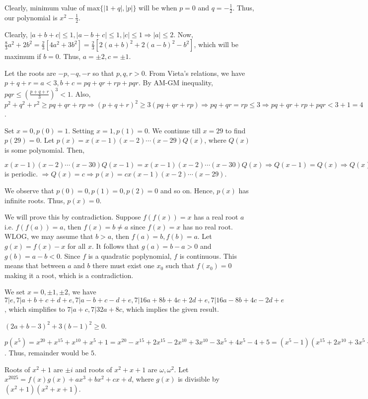   Clearly, minimum value of $\mathrm{max}\{|1 + q|, |p|\}$ will be when $p = 0$ and $q = -\frac{1}{2}$. Thus, our
  polynomial is $x^2 - \frac{1}{2}$.
\item Clearly, $|a + b + c|\leq 1, |a - b + c|\leq 1, |c|\leq 1 \Rightarrow |a|\leq 2$. Now, $\frac{8}{3}a^2
  + 2b^2 = \frac{2}{3}[4a^2 + 3b^2] = \frac{2}{3}[2(a + b)^2 + 2(a - b)^2 - b^2]$, which will be maximum if
  $b = 0$. Thus, $a = \pm 2, c = \pm 1$.
\item Let the roots are $-p, -q, -r$ so that $p, q, r > 0$. From Vieta's relations, we have $p + q + r = a <
  3, b + c = pq + qr + rp + pqr$. By AM-GM inequality, $pqr\leq\left(\frac{p + q + r}{3}\right)^3 <
  1$. Also, $p^2 + q^2 + r^2\geq pq + qr + rp \Rightarrow (p + q + r)^2\geq 3(pq + qr + rp)\Rightarrow pq +
  qr = rp \leq 3 \Rightarrow pq + qr + rp + pqr < 3 + 1 = 4$.
\item Set $x = 0, p(0) = 1$. Setting $x = 1, p(1) = 0$. We continue till $x = 29$ to find $p(29) = 0$. Let
  $p(x) = x(x - 1)(x - 2)\cdots(x - 29)Q(x)$, where $Q(x)$ is some polynomial. Then,

  $x(x - 1)(x - 2)\cdots(x- 30)Q(x - 1) = x(x - 1)(x - 2)\cdots(x - 30)Q(x)\Rightarrow Q(x - 1) = Q(x)
  \Rightarrow Q(x)$ is periodic. $\Rightarrow Q(x) = c\Rightarrow p(x) = cx(x - 1)(x - 2)\cdots(x - 29)$.
\item We observe that $p(0) = 0, p(1) = 0, p(2) = 0$ and so on. Hence, $p(x)$ has infinite roots. Thus,
  $p(x) = 0$.
\item We will prove this by contradiction. Suppose $f(f(x)) = x$ has a real root $a$ i.e. $f(f(a)) = a$,
  then $f(x) = b\neq a$ since $f(x) = x$ has no real root. WLOG, we may assume that $b > a$, then
  $f(a) = b, f(b) = a$. Let $g(x) = f(x) - x$ for all $x$. It follows that $g(a) = b - a > 0$ and $g(b) = a
  - b < 0$. Since $f$ is a quadratic poplynomial, $f$ is continuous. This means that between $a$ and $b$
  there must exist one $x_0$ such that $f(x_0) = 0$ making it a root, which is a contradiction.
\item We set $x = 0, \pm1, \pm 2$, we have $7|e, 7|a + b + c + d + e, 7|a - b + c - d + e, 7|16a + 8b + 4c +
  2d + e, 7|16a - 8b + 4c - 2d + e$, which simplifies to $7|a + c, 7|32a + 8c$, which implies the given
  result.
\item $(2a + b - 3)^2 + 3(b - 1)^2\geq 0$.
\item $p(x^5) = x^{20} + x^{15} + x^{10} + x^5 + 1 = x^{20} - x^{15} + 2x^{15} - 2x^{10} + 3x^{10} - 3x^5 +
  4x^5 - 4 + 5 = (x^5 - 1)(x^{15} + 2x^{10} + 3x^5 + 4) + 5 = f(x)(x - 1)(x^{15} + 2x^{10} + 3x^5 + 4) +
  5$. Thus, remainder would be $5$.
\item Roots of $x^2 + 1$ are $\pm i$ and roots of $x^2 + x + 1$ are $\omega, \omega^2$. Let
  $x^{2025} = f(x)g(x) + ax^3 + bx^2 + cx + d$, where $g(x)$ is divisible by
  $(x^2 + 1)(x^2 + x + 1)$.


